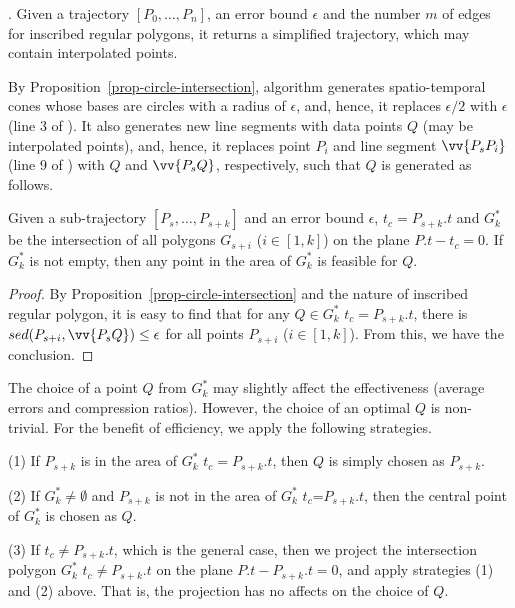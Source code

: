 .
Given a trajectory ${[P_0, \ldots, P_n]}$, an error bound $\epsilon$ and the number $m$ of edges for inscribed
regular polygons, it returns a simplified trajectory,
which may contain interpolated points.

By Proposition~\ref{prop-circle-intersection}, algorithm \cista generates spatio-temporal cones whose bases are circles with a radius of $\epsilon$,
and, hence, it replaces $\epsilon/2$ with $\epsilon$ (line 3 of \cist). It also generates new line segments with data points $Q$ (may be interpolated points), and,
hence, it replaces point $P_i$ and line segment $\vv{P_sP_i}$  (line 9 of \cist) with $Q$ and $\vv{P_sQ}$, respectively,  such that $Q$ is generated as follows.


\begin{prop}
\label{prop-cist-Q}
Given a sub-trajectory ${[P_s, \ldots, P_{s+k}]}$ and an error bound $\epsilon$,  $t_c=P_{s+k}.t$ and $G^*_k$ be the intersection of all polygons $G_{s+i}$ ($i\in[1,k]$) on the plane $P.t - t_c = 0$. If $G^*_k$ is not empty, then any point in the area of $G^*_k$ is feasible for $Q$.
\end{prop}

\begin{proof}
By Proposition~\ref{prop-circle-intersection} and the nature of inscribed regular polygon, it is easy to find that for any $Q \in G^*_k$  \wrt $t_c=P_{s+k}.t$, there is $sed(P_{s+i}, \vv{P_sQ})\le \epsilon$ for all points $P_{s+i}$ ($i \in [1,k]$). From this, we have the conclusion.
\end{proof}

The choice of a point $Q$ from $G^*_k$ may slightly affect the effectiveness (\eg average errors and compression ratios). However, the choice of an optimal $Q$ is non-trivial. For the benefit of efficiency, we apply the following strategies.

\sstab (1) If $P_{s+k}$ is in the area of $G^*_k$ \wrt $t_c=P_{s+k}.t$, then $Q$ is simply chosen as $P_{s+k}$.

\sstab (2) If $G^*_k \ne \emptyset$ and $P_{s+k}$ is not in the area of $G^*_k$ \wrt $t_c$=$P_{s+k}.t$, then the central point of $G^*_k$ is chosen as $Q$.

\sstab (3)  If $t_c \ne P_{s+k}.t$, which is the general case, then we project the intersection polygon $G^*_k$ \wrt $t_c \ne P_{s+k}.t$ on the plane $P.t -P_{s+k}.t = 0$, and apply strategies (1) and (2) above. That is, the projection has no affects on the choice of $Q$.

